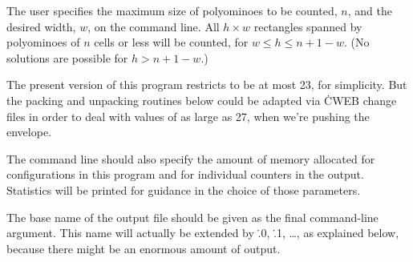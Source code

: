 The user specifies the maximum size of polyominoes to be
counted, $n$,
and the desired width, $w$, on the command line. All $h\times w$ rectangles
spanned by polyominoes of $n$ cells or less will be counted, for
$w\le h\le n+1-w$. (No solutions are possible for $h>n+1-w$.)

The present version of this program restricts  to be at most
23, for simplicity. But the packing and unpacking routines below could be
adapted via \.{CWEB} change files in order to deal with
values of  as large as 27, when we're pushing the envelope.

The command line should also specify the amount of memory allocated for
configurations in this program and for individual counters in the output.
Statistics will be printed for guidance in the choice of those parameters.

The base name of the output file should be given as the final command-line
argument. This name will actually be extended by \.{.0}, \.{.1}, \dots,
as explained below, because there might be an enormous amount of output.

